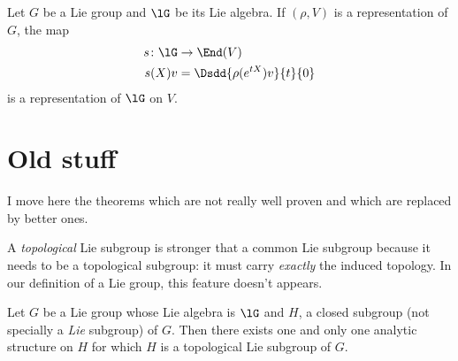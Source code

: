 \begin{theorem}       \label{THOooLVSNooOpzYgO}
    Let \( G\) be a Lie group and \( \lG\) be its Lie algebra. If \( (\rho, V)\) is a representation of \( G\), the map
    \begin{equation}
        \begin{aligned}
            s\colon \lG&\to \End(V) \\
            s(X)v&=\Dsdd{ \rho( e^{tX})v }{t}{0} 
        \end{aligned}
    \end{equation}
    is a representation of \( \lG\) on \( V\).
\end{theorem}

\section{Old stuff}

I move here the theorems which are not really well proven and which are replaced by better ones.
\begin{remark}
A \textit{topological} Lie subgroup is stronger that a common Lie subgroup because it needs to be a topological subgroup: it must carry \emph{exactly} the induced topology. In our definition of a Lie group, this feature doesn't appears.
\end{remark}

\begin{theorem}\label{tho:diff_sur_ferme}
    Let $G$ be a Lie group whose Lie algebra is $\lG$ and $H$, a closed subgroup (not specially a \emph{Lie} subgroup) of $G$. Then there exists one and only one analytic structure on $H$ for which $H$ is a topological Lie subgroup of $G$.
\end{theorem}


